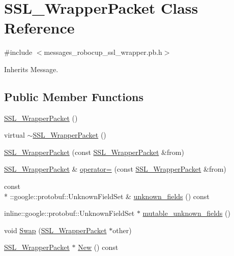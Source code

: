 \hypertarget{class_s_s_l___wrapper_packet}{\section{S\-S\-L\-\_\-\-Wrapper\-Packet Class Reference}
\label{class_s_s_l___wrapper_packet}
}


{\ttfamily \#include $<$messages\-\_\-robocup\-\_\-ssl\-\_\-wrapper.\-pb.\-h$>$}



Inherits Message.

\subsection*{Public Member Functions}
\begin{DoxyCompactItemize}
\item 
\hyperlink{class_s_s_l___wrapper_packet_a59388d84905d348178b490c966e6f85c}{S\-S\-L\-\_\-\-Wrapper\-Packet} ()
\item 
virtual \hyperlink{class_s_s_l___wrapper_packet_aae83974936f1a26f0edb6e99c0dd322f}{$\sim$\-S\-S\-L\-\_\-\-Wrapper\-Packet} ()
\item 
\hyperlink{class_s_s_l___wrapper_packet_ad1bcf434675a399c90a0a897586f5b84}{S\-S\-L\-\_\-\-Wrapper\-Packet} (const \hyperlink{class_s_s_l___wrapper_packet}{S\-S\-L\-\_\-\-Wrapper\-Packet} \&from)
\item 
\hyperlink{class_s_s_l___wrapper_packet}{S\-S\-L\-\_\-\-Wrapper\-Packet} \& \hyperlink{class_s_s_l___wrapper_packet_aa37cf79396ffa3f55e0599e2ffe9b12b}{operator=} (const \hyperlink{class_s_s_l___wrapper_packet}{S\-S\-L\-\_\-\-Wrapper\-Packet} \&from)
\item 
const \\*
\-::google\-::protobuf\-::\-Unknown\-Field\-Set \& \hyperlink{class_s_s_l___wrapper_packet_ac2ec6fe6c9b6c26bc4ff2fb20cc9e009}{unknown\-\_\-fields} () const 
\item 
inline\-::google\-::protobuf\-::\-Unknown\-Field\-Set $\ast$ \hyperlink{class_s_s_l___wrapper_packet_a247dacfaf298d7ad857090f0e3139a7e}{mutable\-\_\-unknown\-\_\-fields} ()
\item 
void \hyperlink{class_s_s_l___wrapper_packet_aa072f8158b018697f66b2dbe9504b7b6}{Swap} (\hyperlink{class_s_s_l___wrapper_packet}{S\-S\-L\-\_\-\-Wrapper\-Packet} $\ast$other)
\item 
\hyperlink{class_s_s_l___wrapper_packet}{S\-S\-L\-\_\-\-Wrapper\-Packet} $\ast$ \hyperlink{class_s_s_l___wrapper_packet_a7c862f4d11434b618a7932c29f145ca3}{New} () const 

\end{DoxyCompactItemize}
